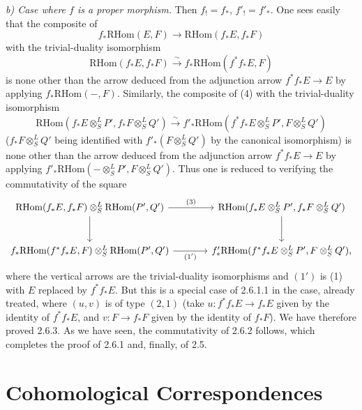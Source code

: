 \documentclass[11pt]{article}
\providecommand{\RHom}{\mathrm{RHom}}
\providecommand{\RHom}{\mathrm{RHom}}
\providecommand{\RHom}{\mathrm R\mathcal{H}om}
\providecommand{\RHom}{\mathrm{RHom}}
\begin{document}
\emph{b) Case where $f$ is a proper morphism.} Then $f_!=f_*$, $f'_!=f'_*$. One sees easily that the composite of
\[
f_*\RHom(E,F)\longrightarrow\RHom(f_*E,f_*F)
\]
with the trivial-duality isomorphism
\[
\RHom(f_*E,f_*F)\xrightarrow{\sim}f_*\RHom(f^{*}f_*E,F)
\]
is none other than the arrow deduced from the adjunction arrow $f^{*}f_*E\to E$ by applying $f_*\RHom(-,F)$. Similarly, the composite of (4) with the trivial-duality isomorphism
\[
\RHom(f_*E\otimes^L_SP',f_*F\otimes^L_SQ')\xrightarrow{\sim}f'_*\RHom(f^{*}f_*E\otimes^L_SP',F\otimes^L_SQ')
\]
($f_*F\otimes^L_SQ'$ being identified with $f'_*(F\otimes^L_SQ')$ by the canonical isomorphism) is none other than the arrow deduced from the adjunction arrow $f^{*}f_*E\to E$ by applying $f'_*\RHom(-\otimes^L_SP',F\otimes^L_SQ')$. Thus one is reduced to verifying the commutativity of the square
\[
\begin{tikzcd}[column sep=large,row sep=large]
\RHom(f_*E,f_*F)\otimes^L_S\RHom(P',Q') \arrow[r,"(3)"] \arrow[d] & \RHom(f_*E\otimes^L_SP',f_*F\otimes^L_SQ') \arrow[d]\\
f_*\RHom(f^{*}f_*E,F)\otimes^L_S\RHom(P',Q') \arrow[r,"(1')"'] & f'_*\RHom(f^{*}f_*E\otimes^L_SP',F\otimes^L_SQ'),
\end{tikzcd}
\]
where the vertical arrows are the trivial-duality isomorphisms and $(1')$ is (1) with $E$ replaced by $f^{*}f_*E$. But this is a special case of 2.6.1.1 in the case, already treated, where $(u,v)$ is of type $(2,1)$ (take $u:f^{*}f_*E\to f_*E$ given by the identity of $f^{*}f_*E$, and $v:F\to f_*F$ given by the identity of $f_*F$). We have therefore proved 2.6.3. As we have seen, the commutativity of 2.6.2 follows, which completes the proof of 2.6.1 and, finally, of 2.5.

\clearpage
\section{Cohomological Correspondences}
\end{document}
